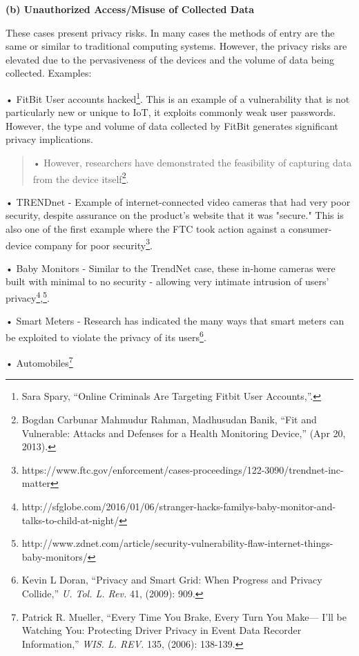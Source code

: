 \textbf{(b) Unauthorized Access/Misuse of Collected Data}

These cases present privacy risks. In many cases the methods of entry
are the same or similar to traditional computing systems. However, the
privacy risks are elevated due to the pervasiveness of the devices and
the volume of data being collected. Examples:

• FitBit User accounts hacked\footnote{Sara Spary, ``Online Criminals
  Are Targeting Fitbit User Accounts,''.}. This is an example of a
vulnerability that is not particularly new or unique to IoT, it exploits
commonly weak user passwords. However, the type and volume of data
collected by FitBit generates significant privacy implications.

\begin{quote}
• However, researchers have demonstrated the feasibility of capturing
data from the device itself\footnote{Bogdan Carbunar Mahmudur Rahman,
  Madhusudan Banik, ``Fit and Vulnerable: Attacks and Defenses for a
  Health Monitoring Device,'' (Apr 20, 2013).}.
\end{quote}

• TRENDnet - Example of internet-connected video cameras that had very
poor security, despite assurance on the product's website that it was
"secure." This is also one of the first example where the FTC took
action against a consumer-device company for poor security\footnote{https://www.ftc.gov/enforcement/cases-proceedings/122-3090/trendnet-inc-matter}.

• Baby Monitors - Similar to the TrendNet case, these in-home cameras
were built with minimal to no security - allowing very intimate
intrusion of users' privacy\footnote{http://sfglobe.com/2016/01/06/stranger-hacks-familys-baby-monitor-and-talks-to-child-at-night/},\footnote{http://www.zdnet.com/article/security-vulnerability-flaw-internet-things-baby-monitors/}.

• Smart Meters - Research has indicated the many ways that smart meters
can be exploited to violate the privacy of its users\footnote{Kevin L
  Doran, ``Privacy and Smart Grid: When Progress and Privacy Collide,''
  \emph{U. Tol. L. Rev.} 41, (2009): 909.}.

• Automobiles\footnote{Patrick R. Mueller, ``Every Time You Brake, Every
  Turn You Make--- I'll be Watching You: Protecting Driver Privacy in
  Event Data Recorder Information,'' \emph{WIS. L. REV.} 135, (2006):
  138-139.}